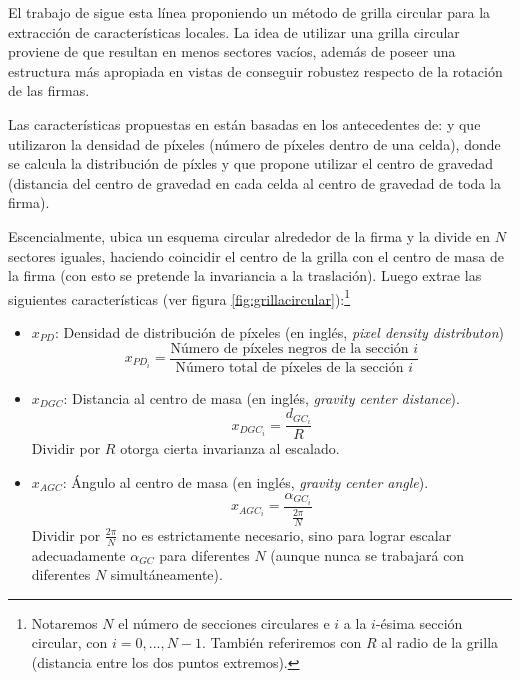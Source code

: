 El trabajo de \cite{tesis-parodi} sigue esta línea proponiendo un método de grilla circular para la extracción de características locales. La idea de utilizar una grilla circular proviene de que resultan en menos sectores vacíos, además de poseer una estructura más apropiada en vistas de conseguir robustez respecto de la rotación de las firmas.

Las características propuestas en \cite{tesis-parodi} están basadas en los antecedentes de: \cite{jybs00} y \cite{js01} que utilizaron la densidad de píxeles (número de píxeles dentro de una celda), \cite{spb94} donde se calcula la distribución de píxles y \cite{jbs05} que propone utilizar el centro de gravedad (distancia del centro de gravedad en cada celda al centro de gravedad de toda la firma).

Escencialmente, \cite{tesis-parodi} ubica un esquema circular alrededor de la firma y la divide en $N$ sectores iguales, haciendo coincidir el centro de la grilla con el centro de masa de la firma (con esto se pretende la invariancia a la traslación). Luego extrae las siguientes características (ver figura \ref{fig:grillacircular}):\footnote{Notaremos $N$ el número de secciones circulares e $i$ a la $i$-ésima sección circular, con $i = 0, ..., N-1$. También referiremos con $R$ al radio de la grilla (distancia entre los dos puntos extremos).}

\begin{itemize}
    \item $x_{PD}$: Densidad de distribución de píxeles (en inglés, \textit{pixel density distributon})
    \begin{equation*}
    x_{PD_{i}} = \frac{\text{Número de píxeles negros de la sección }i}{\text{Número total de píxeles de la sección }i}
    \end{equation*}
    \item $x_{DGC}$: Distancia al centro de masa (en inglés, \textit{gravity center distance}).
    \begin{equation*}
    x_{DGC_{i}} = \frac{d_{GC_{i}}}{R}
    \end{equation*}
    Dividir por $R$ otorga cierta invarianza al escalado.
    \item $x_{AGC}$: Ángulo al centro de masa (en inglés, \textit{gravity center angle}).
    \begin{equation*}
        x_{AGC_{i}} = \frac{\alpha_{GC_{i}}}{\frac{2\pi}{N}}
    \end{equation*}
    Dividir por $\frac{2\pi}{N}$ no es estrictamente necesario, sino para lograr  escalar adecuadamente $\alpha_{GC}$ para diferentes $N$ (aunque nunca se trabajará con diferentes $N$ simultáneamente).
\end{itemize}

